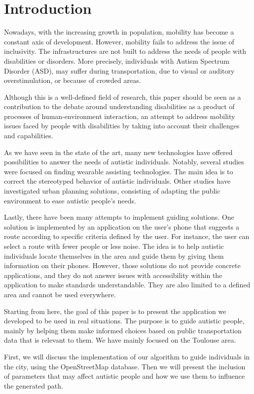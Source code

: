 \section{Introduction}


Nowadays, with the increasing growth in population, mobility has become a constant axis of development. However, mobility fails to address the issue of inclusivity. The infrastructures are not built to address the needs of people with disabilities or disorders. More precisely, individuals with Autism Spectrum Disorder (ASD), may suffer during transportation, due to visual or auditory overstimulation, or because of crowded areas.


Although this is a well-defined field of research, this paper should be seen as a contribution to the debate around understanding disabilities as a product of processes of human-environment interaction, an attempt to address mobility issues faced by people with disabilities by taking into account their challenges and capabilities.


As we have seen in the state of the art, many new technologies have offered possibilities to answer the needs of autistic individuals. Notably, several studies were focused on finding wearable assisting technologies. The main idea is to correct the stereotyped behavior of autistic individuals. Other studies have investigated urban planning solutions, consisting of adapting the public environment to ease autistic people's needs.


Lastly, there have been many attempts to implement guiding solutions. One solution is implemented by an application on the user’s phone that suggests a route according to specific criteria defined by the user. For instance, the user can select a route with fewer people or less noise. The idea is to help autistic individuals locate themselves in the area and guide them by giving them information on their phones. However, those solutions do not provide concrete applications, and they do not answer issues with accessibility within the application to make standards understandable. They are also limited to a defined area and cannot be used everywhere.


Starting from here, the goal of this paper is to present the application we developed to be used in real situations. The purpose is to guide autistic people, mainly by helping them make informed choices based on public transportation data that is relevant to them. We have mainly focused on the Toulouse area.


First, we will discuss the implementation of our algorithm to guide individuals in the city, using the OpenStreetMap database. Then we will present the inclusion of parameters that may affect autistic people and how we use them to influence the generated path.
